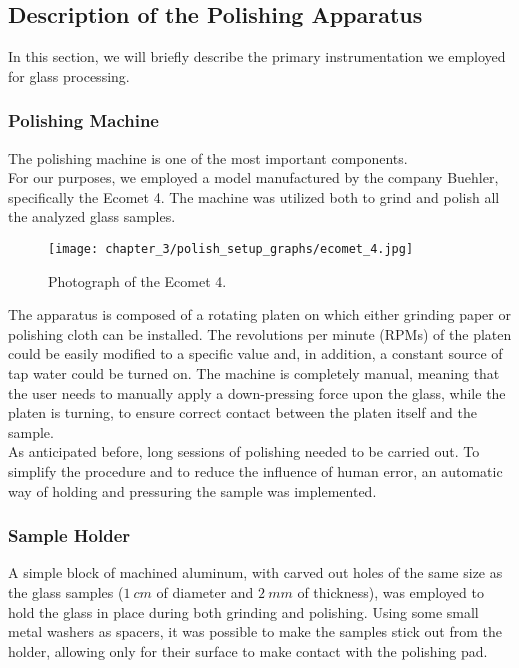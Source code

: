 \subsection{Description of the Polishing Apparatus}
\label{subsec:description_polish_apparatus}
In this section, we will briefly describe the primary instrumentation we employed for glass processing.

\subsubsection{Polishing Machine}
\label{subsubsec:polishing_machine}
The polishing machine is one of the most important components.
\\
For our purposes, we employed a model manufactured by the company Buehler, specifically the Ecomet 4. The machine was utilized both to grind and polish all the analyzed glass samples. 
\begin{figure}[H]
    \centering
    \texttt{[image: chapter\_3/polish\_setup\_graphs/ecomet\_4.jpg]} 
    \caption{Photograph of the Ecomet 4.}
    \label{fig:ecomet_4}
\end{figure}
The apparatus is composed of a rotating platen on which either grinding paper or polishing cloth can be installed. The revolutions per minute (RPMs) of the platen could be easily modified to a specific value and, in addition, a constant source of tap water could be turned on. The machine is completely manual, meaning that the user needs to manually apply a down-pressing force upon the glass, while the platen is turning, to ensure correct contact between the platen itself and the sample.
\\
As anticipated before, long sessions of polishing needed to be carried out. To simplify the procedure and to reduce the influence of human error, an automatic way of holding and pressuring the sample was implemented.

\subsubsection{Sample Holder}
\label{subsubsec:sample_holder}
A simple block of machined aluminum, with carved out holes of the same size as the glass samples ($1\: cm$ of diameter and $2\: mm$ of thickness), was employed to hold the glass in place during both grinding and polishing. Using some small metal washers as spacers, it was possible to make the samples stick out from the holder, allowing only for their surface to make contact with the polishing pad. 

